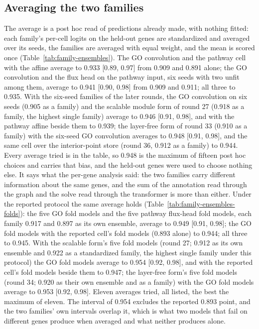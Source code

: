

\subsection{Averaging the two families}
\label{sec:family-ensembles}

The average is a post hoc read of predictions already made, with nothing fitted: each
family's per-cell logits on the held-out genes are standardized and averaged over its
seeds, the families are averaged with equal weight, and the mean is scored once
(Table~\ref{tab:family-ensembles}). The GO convolution and the pathway cell with the
affine average to 0.933 [0.89, 0.97] from 0.909 and 0.891 alone; the GO convolution
and the flux head on the pathway input, six seeds with two unfit among them, average
to 0.941 [0.90, 0.98] from 0.909 and 0.911; all three to 0.935. With the six-seed
families of the later rounds, the GO convolution on six seeds (0.905 as a family) and
the scalable module form of round 27 (0.918 as a family, the highest single family)
average to 0.946 [0.91, 0.98], and with the pathway affine beside them to 0.939; the
layer-free form of round 33 (0.910 as a family) with the six-seed GO convolution
averages to 0.948 [0.91, 0.98], and the same cell over the interior-point store
(round 36, 0.912 as a family) to 0.944. Every average tried is in the table, so 0.948
is the maximum of fifteen post hoc choices and carries that bias, and the held-out
genes were used to choose nothing else. It says
what the per-gene
analysis said: the two families carry different information about the same genes, and
the sum of the annotation read through the graph and the solve read through the
transformer is more than either. Under the reported protocol the same average holds
(Table~\ref{tab:family-ensembles-folds}): the five GO fold models and the five
pathway flux-head fold models, each family 0.917 and 0.897 as its own ensemble,
average to 0.949 [0.91, 0.98]; the GO fold models with the reported cell's fold models
(0.893 alone) to 0.944; all three to 0.945. With the scalable form's five fold models
(round 27; 0.912 as its own ensemble and 0.922 as a standardized family, the highest
single family under this protocol) the GO fold models average to 0.954 [0.92, 0.98],
and with the reported cell's fold models beside them to 0.947; the layer-free form's
five fold models (round 34; 0.920 as their own ensemble and as a family) with the GO
fold models average to 0.953 [0.92, 0.98]. Eleven averages tried, all listed, the
best the maximum of eleven. The interval of 0.954 excludes the reported
0.893 point, and the two families' own intervals overlap it, which is what two models
that fail on different genes produce when averaged and what neither produces alone.

